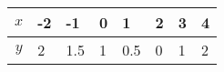 \documentclass[11pt,dvipsnames]{article}
\begin{document}
\begin{enumerate}[label=$\blacktriangleright$ {\bf  \arabic*:}]
	\begin{minipage}{\linewidth}
		\centering
		 \label{tab:ettob4}  
		\begin{tabularx}{0.8\textwidth}{|X|X|X|X|X|X|X|X|X|}
			\hline
			\multicolumn{2}{|c|}{$x$}         & -2 & -1 & 0 & 1 & 2 & 3 & 4   \\ \hline
			\multicolumn{2}{|c|}{$\displaystyle y$} &2 &  1.5 &  1   &  0.5   &0     & 1    &  2      \\ \hline
		\end{tabularx}
	\end{minipage}
\end{enumerate}
\end{document}
